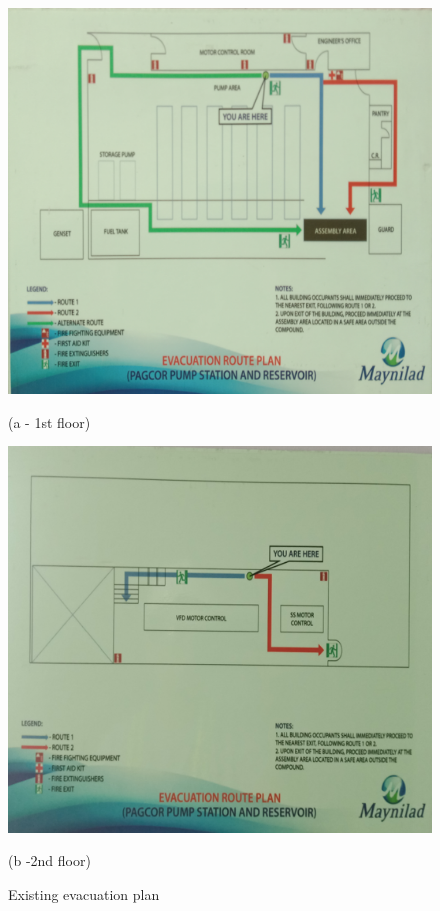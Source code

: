 \begin{figure}[!h]
	\begin{minipage}[b]{0.5\linewidth}
		\centering
		\includegraphics[width=\textwidth]{figures/ch04_fig_safety01}
		\caption*{(a - 1st floor)}
	\end{minipage}
	\hspace{0.05cm}
	\begin{minipage}[b]{0.5\linewidth}
		\centering
		\includegraphics[width=\textwidth]{figures/ch04_fig_safety02}
		\caption*{(b -2nd floor)}
	\end{minipage}
	\caption{Existing evacuation plan}
	\label{ch04_fig_safety01}
\end{figure}


